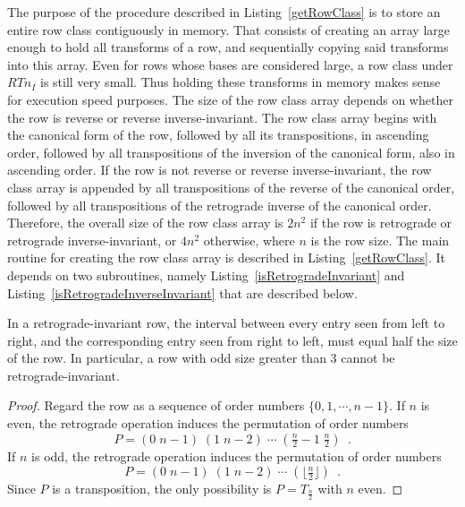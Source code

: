The purpose of the procedure described in Listing~\ref{getRowClass} is to store an entire row class contiguously in memory. That consists of creating an array large enough to hold all transforms of a row, and sequentially copying said transforms into this array. Even for rows whose bases are considered large, a row class under $RTn_I$ is still very small. Thus holding these transforms in memory makes sense for execution speed purposes. The size of the row class array depends on whether the row is reverse or reverse inverse-invariant. The row class array begins with the canonical form of the row, followed by all its transpositions, in ascending order, followed by all transpositions of the inversion of the canonical form, also in ascending order. If the row is not reverse or reverse inverse-invariant, the row class array is appended by all transpositions of the reverse of the canonical order, followed by all transpositions of the retrograde inverse of the canonical order. Therefore, the overall size of the row class array is $2n^2$ if the row is retrograde or retrograde inverse-invariant, or $4n^2$ otherwise, where $n$ is the row size. The main routine for creating the row class array is described in Listing~\ref{getRowClass}. It depends on two subroutines, namely Listing~\ref{isRetrogradeInvariant} and Listing~\ref{isRetrogradeInverseInvariant} that are described below.

\begin{lemma}
	\label{retrograde-invariance}
	In a retrograde-invariant row, the interval between every entry seen from left to right, and the corresponding entry seen from right to left, must equal half the size of the row. In particular, a row with odd size greater than $3$ cannot be retrograde-invariant.
	\begin{proof}
	Regard the row as a sequence of order numbers $\{0, 1, \cdots, n - 1\}$. If $n$ is even, the retrograde operation induces the permutation of order numbers
	\begin{equation}
		P = (0 \; n - 1) \; (1 \; n - 2) \; \cdots \; (\tfrac{n}{2} - 1 \; \tfrac{n}{2}) \enspace .
	\end{equation}
	If $n$ is odd, the retrograde operation induces the permutation of order numbers
	\begin{equation}
		P = (0 \; n - 1) \; (1 \; n - 2) \; \cdots \; (\lfloor \tfrac{n}{2} \rfloor) \enspace .
	\end{equation}
	Since $P$ is a transposition, the only possibility is $P = T_{\frac{n}{2}}$ with $n$ even.
	\end{proof}
\end{lemma}


